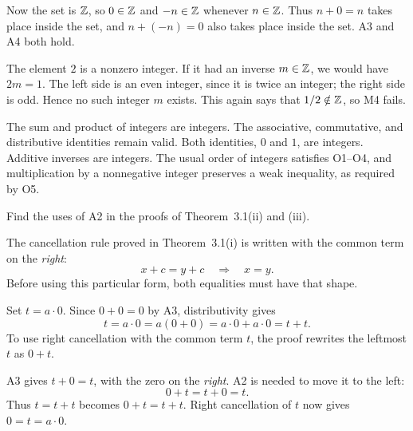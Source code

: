 
Now the set is $\mathbb{Z}$, so $0\in\mathbb{Z}$ and $-n\in\mathbb{Z}$ whenever $n\in\mathbb{Z}$.
Thus $n+0=n$ takes place inside the set, and $n+(-n)=0$ also takes place
inside the set. A3 and A4 both hold.

The element $2$ is a nonzero integer. If it had an inverse $m\in\mathbb{Z}$,
we would have $2m=1$. The left side is an even integer, since it is twice
an integer; the right side is odd. Hence no such integer $m$ exists.
This again says that $1/2\notin\mathbb{Z}$, so M4 fails.

The sum and product of integers are integers. The associative,
commutative, and distributive identities remain valid. Both identities,
$0$ and $1$, are integers. Additive inverses are integers. The usual
order of integers satisfies O1--O4, and multiplication by a nonnegative
integer preserves a weak inequality, as required by O5.



\goal Find the uses of A2 in the proofs of Theorem~3.1(ii) and (iii).

\idea The cancellation rule proved in Theorem~3.1(i) is written with the
common term on the \emph{right}:
\[
 x+c=y+c\quad\Longrightarrow\quad x=y.
\]
Before using this particular form, both equalities must have that shape.

Set $t=a\cdot0$. Since $0+0=0$ by A3, distributivity gives
\[
 t=a\cdot0=a(0+0)=a\cdot0+a\cdot0=t+t.
\]
To use right cancellation with the common term $t$, the proof rewrites
the leftmost $t$ as $0+t$.

A3 gives $t+0=t$, with the zero on the \emph{right}. A2 is needed to move
it to the left:
\[
 0+t=t+0=t.
\]
Thus $t=t+t$ becomes $0+t=t+t$. Right cancellation of $t$ now gives
$0=t=a\cdot0$.

